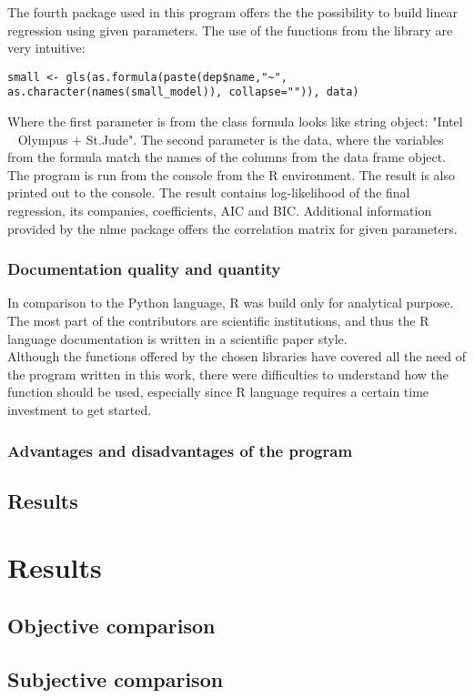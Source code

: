 \documentclass{article}
\begin{document}
The fourth package used in this program offers the the possibility to build linear regression using given parameters. The use of the functions from the library are very intuitive:
\begin{verbatim}
small <- gls(as.formula(paste(dep$name,"~", as.character(names(small_model)), collapse="")), data)
\end{verbatim} 
Where the first parameter is from the class formula looks like string object: "Intel ~ Olympus + St.Jude". The second parameter is the data, where the variables from the formula match the names of the columns from the data frame object.\\
The program is run from the console from the R environment. The result is also printed out to the console. The result contains log-likelihood of the final regression, its companies, coefficients, AIC and BIC. Additional information provided by the nlme package offers the correlation matrix for given parameters.  
\subsubsection{Documentation quality and quantity}
In comparison to the Python language, R was build only for analytical purpose. The most part of the contributors are scientific institutions, and thus the R language documentation is written in a scientific paper style. \\
Although the functions offered by the chosen libraries have covered all the need of the program written in this work, there were difficulties to understand how the function should be used, especially since R language requires a certain time investment to get started.
\subsubsection{Advantages and disadvantages of the program}
\subsection{Results}

\newpage
\section{Results}
\subsection{Objective comparison}
\subsection{Subjective comparison}
\end{document}
